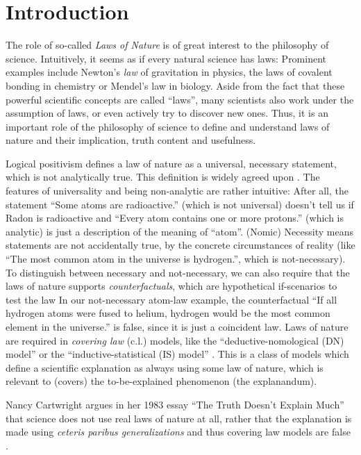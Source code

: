 \section*{Introduction}

The role of so-called \emph{Laws of Nature} is of great interest
to the philosophy of science.
Intuitively, it seems as if every natural science has laws:
Prominent examples include Newton's \emph{law} of gravitation in physics,
the laws of covalent bonding in chemistry or Mendel's law in biology.
Aside from the fact that these powerful scientific concepts are called \enquote{laws},
many scientists also work under the assumption of laws, or
even actively try to discover new ones.
Thus, it is an important role of the philosophy of science to define and understand
laws of nature and their implication, truth content and usefulness.

Logical positivism defines a law of nature as a universal, necessary statement, which is not analytically true.
This definition is widely agreed upon \cite[57]{philsciencebook}.
The features of universality and being non-analytic are rather intuitive:
After all, the statement \enquote{Some atoms are radioactive.} (which is not universal) doesn't tell us if
Radon is radioactive and \enquote{Every atom contains one or more protons.} (which is analytic)
is just a description of the meaning of \enquote{atom}.
(Nomic) Necessity means statements are not accidentally true,
by the concrete circumstances of reality
(like \enquote{The most common atom in the universe is hydrogen.}, which is not-necessary).
To distinguish between necessary and not-necessary, we can also require that
the laws of nature supports \emph{counterfactuals}, which are hypothetical if-scenarios
to test the law
In our not-necessary atom-law example, the counterfactual
\enquote{If all hydrogen atoms were fused to helium, hydrogen would be the most common element in the universe.}
is false, since it is just a coincident law.
Laws of nature are required in \emph{covering law} (c.l.) models, like the \enquote{deductive-nomological (DN) model}
or the \enquote{inductive-statistical (IS) model} \cite[Ch. 3]{philsciencebook}.
This is a class of models which define a scientific explanation as
always using some law of nature, which is relevant to (covers) the to-be-explained phenomenon
(the explanandum).

Nancy Cartwright argues in her 1983 essay \enquote{The Truth Doesn't Explain Much}
that science does not use real laws of nature at all, rather that the explanation
is made using \emph{ceteris paribus generalizations} and thus
covering law models are false \cite{cartwright1980truth}.


